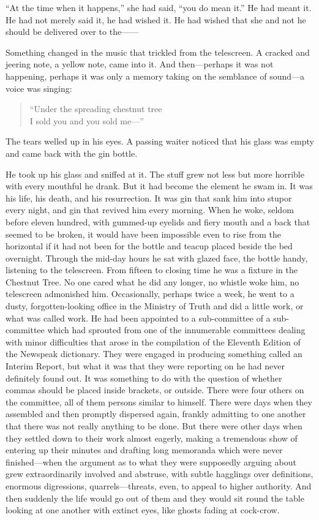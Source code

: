 ``At the time when it happens,'' she had said, ``you do mean it.'' He had
meant it. He had not merely said it, he had wished it. He had wished
that she and not he should be delivered over to the------

Something changed in the music that trickled from the telescreen. A
cracked and jeering note, a yellow note, came into it. And
then---perhaps it was not happening, perhaps it was only a memory taking
on the semblance of sound---a voice was singing:

\begin{quotation}
 \noindent ``Under the spreading chestnut tree\\
  I sold you and you sold me---''
\end{quotation}

The tears welled up in his eyes. A passing waiter noticed that his glass
was empty and came back with the gin bottle.

He took up his glass and sniffed at it. The stuff grew not less but more
horrible with every mouthful he drank. But it had become the element he
swam in. It was his life, his death, and his resurrection. It was gin
that sank him into stupor every night, and gin that revived him every
morning. When he woke, seldom before eleven hundred, with gummed-up
eyelids and fiery mouth and a back that seemed to be broken, it would
have been impossible even to rise from the horizontal if it had not been
for the bottle and teacup placed beside the bed overnight. Through the
mid-day hours he sat with glazed face, the bottle handy, listening to
the telescreen. From fifteen to closing time he was a fixture in the
Chestnut Tree. No one cared what he did any longer, no whistle woke him,
no telescreen admonished him. Occasionally, perhaps twice a week, he
went to a dusty, forgotten-looking office in the Ministry of Truth and
did a little work, or what was called work. He had been appointed to a
sub-committee of a sub-committee which had sprouted from one of the
innumerable committees dealing with minor difficulties that arose in the
compilation of the Eleventh Edition of the Newspeak dictionary. They
were engaged in producing something called an Interim Report, but what
it was that they were reporting on he had never definitely found out. It
was something to do with the question of whether commas should be placed
inside brackets, or outside. There were four others on the committee,
all of them persons similar to himself. There were days when they
assembled and then promptly dispersed again, frankly admitting to one
another that there was not really anything to be done. But there were
other days when they settled down to their work almost eagerly, making a
tremendous show of entering up their minutes and drafting long memoranda
which were never finished---when the argument as to what they were
supposedly arguing about grew extraordinarily involved and abstruse,
with subtle hagglings over definitions, enormous digressions,
quarrels---threats, even, to appeal to higher authority. And then
suddenly the life would go out of them and they would sit round the
table looking at one another with extinct eyes, like ghosts fading at
cock-crow.

